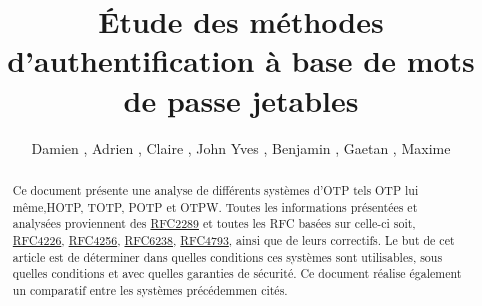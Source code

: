 \documentclass{../res/univ-projet}
\title{\'Etude des méthodes d'authentification à base de mots de passe jetables}
\author{Damien \bsc{PICARD}, Adrien \bsc{SMONDACK}, Claire \bsc{HARDOUIN}, John Yves \bsc{TAYEWO}, Benjamin \bsc{ZIGH}, Gaetan \bsc{FERRY}, Maxime \bsc{MICHOTTE} }
\begin{document}
\maketitle

\begin{abstract}
Ce document présente une analyse de différents systèmes d'OTP tels \og{}OTP\fg{} lui même,\og{}HOTP\fg{}, \og{}TOTP\fg{}, \og{}POTP\fg{} 
et \og{}OTPW\fg{}. Toutes les informations présentées et analysées proviennent des \href{http://tools.ietf.org/html/rfc2289}{RFC2289} et 
toutes les RFC basées sur celle-ci soit, \href{http://tools.ietf.org/html/rfc4226}{RFC4226}, \href{http://tools.ietf.org/html/rfc4256}{RFC4256}, 
\href{http://tools.ietf.org/html/rfc6238}{RFC6238}, \href{http://tools.ietf.org/html/rfc4793}{RFC4793}, 
ainsi que de leurs correctifs. Le but de cet article est de déterminer dans quelles conditions ces systèmes sont utilisables, sous quelles conditions 
et avec quelles garanties de sécurité. Ce document réalise également un comparatif entre les systèmes précédemmen cités.
\end{abstract}
\newpage
\tableofcontents
\newpage
\end{document}
